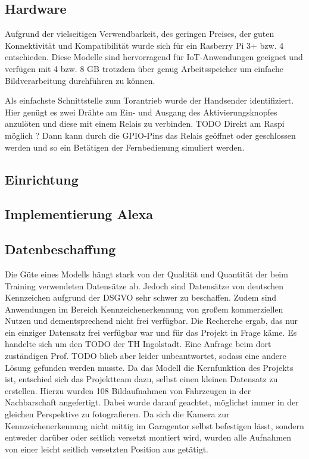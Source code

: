 \subsection{Hardware}
Aufgrund der vielseitigen Verwendbarkeit, des geringen Preises, der guten Konnektivität und Kompatibilität wurde sich für ein Rasberry Pi 3+ bzw. 4 entschieden. Diese Modelle sind hervorragend für IoT-Anwendungen geeignet und verfügen mit 4 bzw. 8 GB trotzdem über genug Arbeitsspeicher um einfache Bildverarbeitung durchführen zu können. 

Als einfachste Schnittstelle zum Torantrieb wurde der Handsender identifiziert. Hier genügt es zwei Drähte am Ein- und Ausgang des Aktivierungsknopfes anzulöten und diese mit einem Relais zu verbinden. TODO Direkt am Raspi möglich ? Dann kann durch die \ac{GPIO}-Pins das Relais geöffnet oder geschlossen werden und so ein Betätigen der Fernbedienung simuliert werden.

\subsection{Einrichtung}


\subsection{Implementierung Alexa}





\subsection{Datenbeschaffung}
Die Güte eines Modells hängt stark von der Qualität und Quantität der beim Training verwendeten Datensätze ab. Jedoch sind Datensätze von deutschen Kennzeichen aufgrund der \ac{DSGVO} sehr schwer zu beschaffen. Zudem sind Anwendungen im Bereich Kennzeichenerkennung von großem kommerziellen Nutzen und dementsprechend nicht frei verfügbar. Die Recherche ergab, das nur ein einziger Datensatz frei verfügbar war und für das Projekt in Frage käme. Es handelte sich um den TODO der TH Ingolstadt. Eine Anfrage beim dort zuständigen Prof. TODO blieb aber leider unbeantwortet, sodass eine andere Lösung gefunden werden musste.
Da das Modell die Kernfunktion des Projekts ist, entschied sich das Projektteam dazu, selbst einen kleinen Datensatz zu erstellen. 
Hierzu wurden 108 Bildaufnahmen von Fahrzeugen in der Nachbarschaft angefertigt. Dabei wurde darauf geachtet, möglichst immer in der gleichen Perspektive zu fotografieren. Da sich die Kamera zur Kennzeichenerkennung nicht mittig im Garagentor selbst befestigen lässt, sondern entweder darüber oder seitlich versetzt montiert wird, wurden alle Aufnahmen von einer leicht seitlich versetzten Position aus getätigt.

